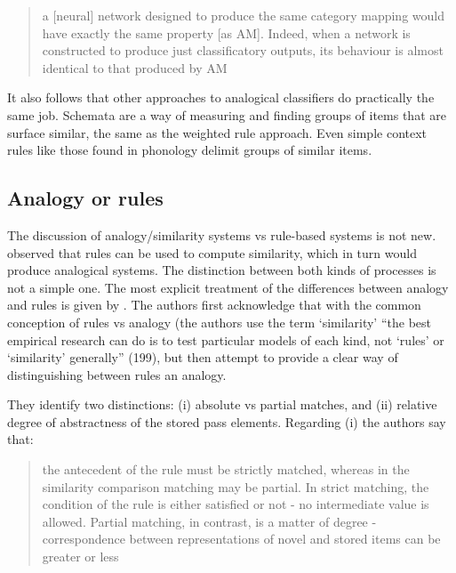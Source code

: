 \begin{quotation}
a [neural] network designed to produce the same category mapping would have exactly the same property [as AM]. Indeed, when a network is constructed to produce just classificatory outputs, its behaviour is almost identical to that produced by AM
\autocite[289]{Matthews.2005}
\end{quotation}

It also follows that other approaches to analogical classifiers do practically the same job. Schemata are a way of measuring and finding groups of items that are surface similar, the same as the weighted rule approach. Even simple context rules like those found in phonology delimit groups of similar items.

\subsection{Analogy or rules}


The discussion of analogy/similarity systems vs rule-based systems is not new. \textcite{Nosofsky.1989} observed that rules can be used to compute similarity, which in turn would produce analogical systems. The distinction between both kinds of processes is not a simple one. The most explicit treatment of the differences between analogy and rules is given by \textcite{Hahn.1998}. The authors first acknowledge that with the common conception of rules vs analogy (the authors use the term `similarity' ``the best empirical research can do is to test particular models of each kind, not `rules' or `similarity' generally'' (199), but then attempt to provide a clear way of distinguishing between rules an analogy.

They identify two distinctions: (i) absolute vs partial matches, and (ii) relative degree of abstractness of the stored pass elements. Regarding (i) the authors say that:

\begin{quotation}
the antecedent of the rule must be strictly matched, whereas in the similarity comparison matching may be partial. In strict matching, the condition of the rule is either  satisfied  or  not  - no  intermediate  value  is  allowed.  Partial  matching,  in contrast, is a matter of degree - correspondence between representations of novel and  stored  items  can  be  greater  or less \autocite[202]{Hahn.1998}
\end{quotation}

